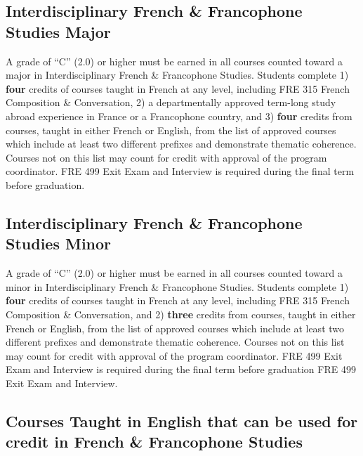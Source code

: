 \documentclass[
  letterpaper,
]{scrbook}
\begin{document}
\subsection{Interdisciplinary French \& Francophone Studies
Major}\label{interdisciplinary-french-francophone-studies-major}

A grade of ``C'' (2.0) or higher must be earned in all courses counted
toward a major in Interdisciplinary French \& Francophone Studies.
Students complete 1) \textbf{four} credits of courses taught in French
at any level, including FRE 315 French Composition \& Conversation, 2) a
departmentally approved term-long study abroad experience in France or a
Francophone country, and 3) \textbf{four} credits from courses, taught
in either French or English, from the list of approved courses which
include at least two different prefixes and demonstrate thematic
coherence. Courses not on this list may count for credit with approval
of the program coordinator. FRE 499 Exit Exam and Interview is required
during the final term before graduation.

\subsection{Interdisciplinary French \& Francophone Studies
Minor}\label{interdisciplinary-french-francophone-studies-minor}

A grade of ``C'' (2.0) or higher must be earned in all courses counted
toward a minor in Interdisciplinary French \& Francophone Studies.
Students complete 1) \textbf{four} credits of courses taught in French
at any level, including FRE 315 French Composition \& Conversation, and
2) \textbf{three} credits from courses, taught in either French or
English, from the list of approved courses which include at least two
different prefixes and demonstrate thematic coherence. Courses not on
this list may count for credit with approval of the program coordinator.
FRE 499 Exit Exam and Interview is required during the final term before
graduation FRE 499 Exit Exam and Interview.

\subsection{Courses Taught in English that can be used for credit in
French \& Francophone
Studies}\label{courses-taught-in-english-that-can-be-used-for-credit-in-french-francophone-studies}
\end{document}
